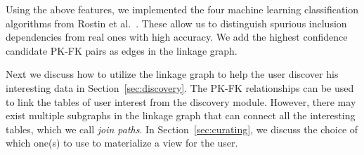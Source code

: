 Using the above features, we implemented the four machine learning classification algorithms from Rostin et al.~\cite{DBLP:conf/webdb/RostinABNL09}. These allow us to distinguish spurious inclusion dependencies from real ones with high accuracy.   We add the highest confidence candidate PK-FK pairs as edges in the linkage graph.

Next we discuss how to utilize the linkage graph to help the user discover his interesting data in Section~\ref{sec:discovery}. The PK-FK relationships can be used to link the tables of user interest from the discovery module. However, there may exist multiple subgraphs in the linkage graph that can connect all the interesting tables, which we call \emph{join paths}. In Section~\ref{sec:curating}, we discuss the choice of which one(s) to use to materialize a view for the user.
